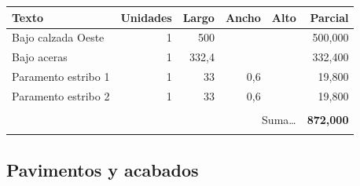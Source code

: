 \documentclass{book}%
\begin{document}
\begin{longtable}{lrrrrr}
Texto&Unidades&Largo&Ancho&Alto&Parcial\\%
\hline%
\multicolumn{1}{p{3.5cm}}{Bajo calzada Oeste }&1&500&&&   500,000\\%
\multicolumn{1}{p{3.5cm}}{Bajo aceras }&1&332,4&&&   332,400\\%
\multicolumn{1}{p{3.5cm}}{Paramento estribo 1}&1&33&0,6&&    19,800\\%
\multicolumn{1}{p{3.5cm}}{Paramento estribo 2}&1&33&0,6&&    19,800\\%
&&&&&\\%
\multicolumn{5}{r}{Suma\ldots}&\textbf{   872,000}\\%
\hline%
&&&&&\\%
\end{longtable}%
\newpage

%
\subsection{Pavimentos y acabados}%
\end{document}
